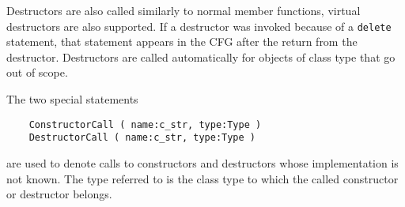 \documentclass[12pt]{article}
\begin{document}
Destructors are also called similarly to normal member functions,
virtual destructors are also supported. If a destructor was invoked
because of a \lstinline|delete| statement, that statement appears in
the CFG after the return from the destructor. Destructors are called
automatically for objects of class type that go out of scope.

The two special statements
\begin{verbatim}
    ConstructorCall ( name:c_str, type:Type )
    DestructorCall ( name:c_str, type:Type )
\end{verbatim}
are used to denote calls to constructors and destructors whose
implementation is not known. The type referred to is the class type
to which the called constructor or destructor belongs.
\end{document}
